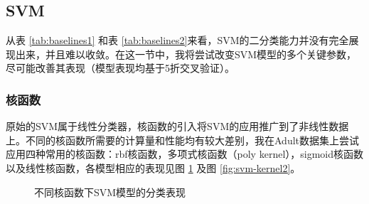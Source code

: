 \documentclass[12pt,a4paper]{article}
\theoremstyle{definition}
\begin{document}
\subsection{SVM}

从表 \ref{tab:baselines1} 和表 \ref{tab:baselines2}来看，SVM的二分类能力并没有完全展现出来，并且难以收敛。在这一节中，我将尝试改变SVM模型的多个关键参数，尽可能改善其表现（模型表现均基于5折交叉验证）。

\subsubsection{核函数}

原始的SVM属于线性分类器，核函数的引入将SVM的应用推广到了非线性数据上。不同的核函数所需要的计算量和性能均有较大差别，我在Adult数据集上尝试应用四种常用的核函数：rbf核函数，多项式核函数（poly kernel），sigmoid核函数以及线性核函数，各模型相应的表现见图 \ref{fig:svm-kernel1} 及图 \ref{fig:svm-kernel2}。

\begin{figure}[H]
	\centering
	\caption{不同核函数下SVM模型的分类表现}
	\label{fig:svm-kernel1}
\end{figure}
\end{document}
